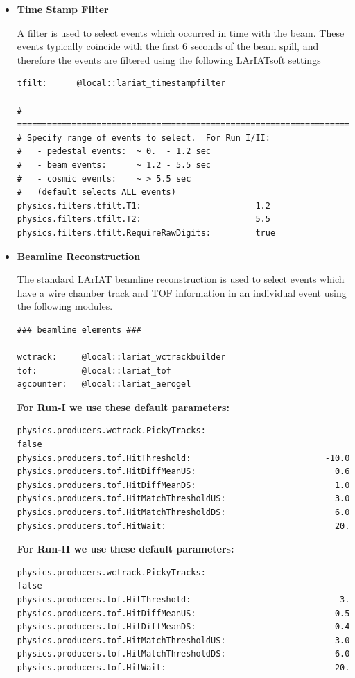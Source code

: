 \begin{itemize}
\item \textbf{Time Stamp Filter}

A filter is used to select events which occurred in time with the beam. These events typically coincide with the first 6 seconds of the beam spill, and therefore the events are filtered using the following LArIATsoft settings

\begin{verbatim}
tfilt:      @local::lariat_timestampfilter

# ====================================================================
# Specify range of events to select.  For Run I/II:
#   - pedestal events:  ~ 0.  - 1.2 sec
#   - beam events:      ~ 1.2 - 5.5 sec
#   - cosmic events:    ~ > 5.5 sec
#   (default selects ALL events)
physics.filters.tfilt.T1:                       1.2
physics.filters.tfilt.T2:                       5.5
physics.filters.tfilt.RequireRawDigits:         true

\end{verbatim}



\item \textbf{Beamline Reconstruction}

The standard LArIAT beamline reconstruction is used to select events which have a wire chamber track and TOF information in an individual event using the following modules.
\begin{verbatim}
### beamline elements ###

wctrack:     @local::lariat_wctrackbuilder
tof:         @local::lariat_tof
agcounter:   @local::lariat_aerogel
\end{verbatim}


\textbf{For Run-I we use these default parameters:}
\begin{verbatim} 
physics.producers.wctrack.PickyTracks:                          false
physics.producers.tof.HitThreshold:                           -10.0  
physics.producers.tof.HitDiffMeanUS:                            0.6  
physics.producers.tof.HitDiffMeanDS:                            1.0  
physics.producers.tof.HitMatchThresholdUS:                      3.0  
physics.producers.tof.HitMatchThresholdDS:                      6.0  
physics.producers.tof.HitWait:                                  20.
\end{verbatim}

\textbf{For Run-II we use these default parameters:}
\begin{verbatim} 
physics.producers.wctrack.PickyTracks:                          false
physics.producers.tof.HitThreshold:                             -3.
physics.producers.tof.HitDiffMeanUS:                            0.5  
physics.producers.tof.HitDiffMeanDS:                            0.4  
physics.producers.tof.HitMatchThresholdUS:                      3.0  
physics.producers.tof.HitMatchThresholdDS:                      6.0  
physics.producers.tof.HitWait:                                  20.
\end{verbatim}


\end{itemize}
